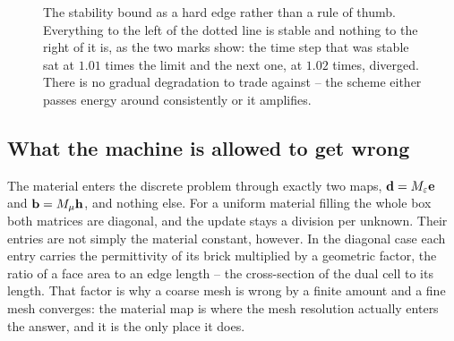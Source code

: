 \begin{figure}[htbp]
\centering
{}
\caption{The stability bound as a hard edge rather than a rule of thumb. Everything to the left of the dotted
line is stable and nothing to the right of it is, as the two marks show: the time step that was stable sat at
$1.01$ times the limit and the next one, at $1.02$ times, diverged. There is no gradual degradation to trade
against -- the scheme either passes energy around consistently or it amplifies.}
\label{fig:hiw:courant}
\end{figure}

\subsection{What the machine is allowed to get wrong}\label{sec:hiw:materials}

The material enters the discrete problem through exactly two maps, $\mathbf{d}={M_{\varepsilon}}\mathbf{e}$ and
$\mathbf{b}={M_{\mu}}\mathbf{h}$, and nothing else. For a uniform material filling the whole box both matrices are
diagonal, and the update stays a division per unknown. Their entries are not simply the material constant,
however. In the diagonal case each entry carries the permittivity of its brick multiplied by a geometric factor,
the ratio of a face area to an edge length -- the cross-section of the dual cell to its length. That factor is
why a coarse mesh is wrong by a finite amount and a fine mesh converges: the material map is where the mesh
resolution actually enters the answer, and it is the only place it does.

